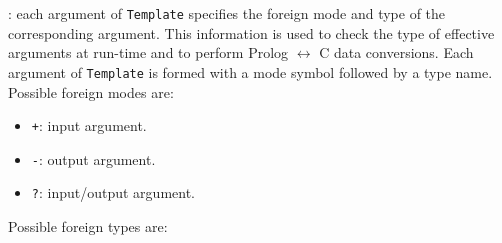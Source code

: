 : each argument of \texttt{Template}
specifies the foreign mode and type of the corresponding argument. This
information is used to check the type of effective arguments at run-time and
to perform Prolog $\leftrightarrow$ C data conversions. Each argument of
\texttt{Template} is formed with a mode symbol followed by a type name.
Possible foreign modes are:

\begin{itemize}

\item \texttt{+}: input argument.

\item \texttt{-}: output argument.

\item \texttt{?}: input/output argument.

\end{itemize}

Possible foreign types are:

